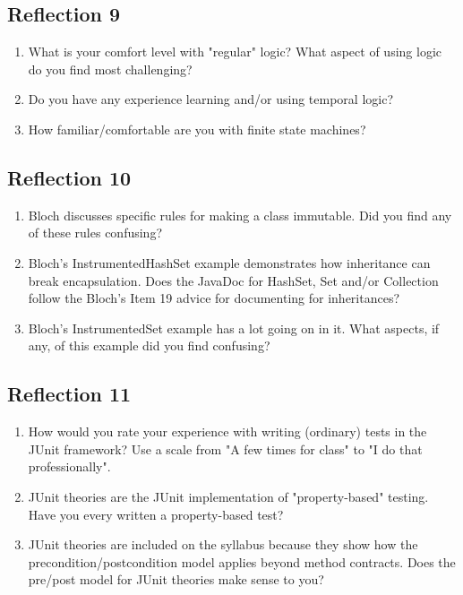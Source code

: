 \documentclass[11pt]{article}
\begin{document}
\subsection{Reflection 9}
\label{sec:orgf98c7fc}

\begin{enumerate}
\item What is your comfort level with "regular" logic? What aspect of using logic do you find most challenging?
\item Do you have any experience learning and/or using temporal logic?
\item How familiar/comfortable are you with finite state machines?
\end{enumerate}



\subsection{Reflection 10}
\label{sec:orgc347855}

\begin{enumerate}
\item Bloch discusses specific rules for making a class immutable. Did you find any of these rules confusing?
\item Bloch's InstrumentedHashSet example demonstrates how inheritance can break encapsulation. Does the JavaDoc for HashSet, Set and/or Collection follow the Bloch's Item 19 advice for documenting for inheritances?
\item Bloch's InstrumentedSet example has a lot going on in it. What aspects, if any, of this example did you find confusing?
\end{enumerate}



\subsection{Reflection 11}
\label{sec:org395c997}


\begin{enumerate}
\item How would you rate your experience with writing (ordinary) tests in the JUnit framework? Use a scale from "A few times for class" to "I do that professionally".
\item JUnit theories are the JUnit implementation of "property-based" testing. Have you every written a property-based test?
\item JUnit theories are included on the syllabus because they show how the precondition/postcondition model applies beyond method contracts. Does the pre/post model for JUnit theories make sense to you?
\end{enumerate}
\end{document}
